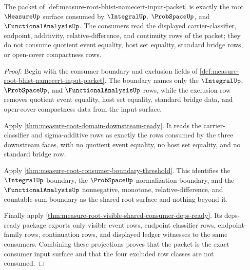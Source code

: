 \begin{theorem}
\label{thm:measure-root-bhist-input-consumer-exactness}
The packet of
\autoref{def:measure-root-bhist-namecert-input-packet} is exactly the root
$\MeasureUp$ surface consumed by $\IntegralUp$, $\ProbSpaceUp$, and
$\FunctionalAnalysisUp$. The consumers read the displayed carrier-classifier,
endpoint, additivity, relative-difference, and continuity rows of the packet;
they do not consume quotient event equality, host set equality, standard
bridge rows, or open-cover compactness rows.
\end{theorem}
\begin{proof}
Begin with the consumer boundary and exclusion fields of
\autoref{def:measure-root-bhist-namecert-input-packet}. The boundary names
only the $\IntegralUp$, $\ProbSpaceUp$, and $\FunctionalAnalysisUp$ rows, while
the exclusion row removes quotient event equality, host set equality,
standard bridge data, and open-cover compactness data from the input surface.

Apply \autoref{thm:measure-root-domain-downstream-ready}. It reads the
carrier-classifier and sigma-additive rows as exactly the rows consumed by the
three downstream faces, with no quotient event equality, no host set equality,
and no standard bridge row.

Apply \autoref{thm:measure-root-consumer-boundary-threshold}. This identifies
the $\IntegralUp$ boundary, the $\ProbSpaceUp$ normalization boundary, and the
$\FunctionalAnalysisUp$ nonnegative, monotone, relative-difference, and
countable-sum boundary as the shared root surface and nothing beyond it.

Finally apply
\autoref{thm:measure-root-visible-shared-consumer-deps-ready}. Its
deps-ready package exports only visible event rows, endpoint classifier rows,
endpoint-family rows, continuation rows, and displayed ledger witnesses to
the same consumers. Combining these projections proves that the packet is the
exact consumer input surface and that the four excluded row classes are not
consumed.
\end{proof}
